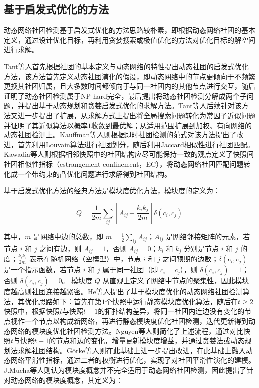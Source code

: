 \subsection{基于启发式优化的方法}
动态网络社团检测基于启发式优化的方法思路较朴素，即根据动态网络社团的基本定义，通过设计优化目标，再利用贪婪搜索或极值优化的方法对优化目标的解空间进行求解。

Tant等人\cite{tantipathananandh2007framework}首先根据社团的基本定义与动态网络的特性提出动态社团的启发式优化方法，该方法首先定义动态社团演化的假设，即动态网络中的节点更倾向于不频繁更换其社团归属，且大多数时间都倾向于与同一社团内的其他节点进行交互，随后证明了动态社团检测属于NP-hard完全，最后提出将动态社团检测分解成两个子问题，并提出基于动态规划和贪婪启发式优化的求解方法。Tant等人后续针对该方法又进一步提出了扩展，从求解方式上提出将全局搜索问题转化为常因子近似问题并证明了其近似算法以概率$1$收敛到最优解\cite{tantipathananandh2009constant}；从适用范围扩展到加权、有向网络的动态社团检测上\cite{tantipathananandh2011finding}。Kauffman等人\cite{kauffman2014dyconet}则根据即时社团检测的范式对该方法提出了改进，首先利用Louvain算法进行社团划分，随后利用Jaccard相似性进行社团匹配。Kawadia等人\cite{kawadia2012sequential}则根据相邻快照中的社团结构应尽可能保持一致的观点定义了快照间社团相似性指标（estrangement confinement，EC），将动态网络社团匹配问题转化成一个带约束的凸优化问题进行求解得到社团结构。

基于启发式优化方法的经典方法是模块度优化方法，模块度\cite{newman2004finding}的定义为：


\begin{equation}
	Q = \frac{1}{2m} \sum_{ij} \left[ A_{ij} - \frac{k_i k_j}{2m} \right] \delta(c_i, c_j)
\end{equation}

其中，\( m \) 是网络中边的总数，即 \( m = \frac{1}{2} \sum_{ij} A_{ij} \)；\( A_{ij} \) 是网络邻接矩阵的元素，若节点 \( i \) 和 \( j \) 之间有边，则 \( A_{ij} = 1 \)，否则 \( A_{ij} = 0 \)；\( k_i \) 和 \( k_j \) 分别是节点 \( i \) 和 \( j \) 的度；\( \frac{k_i k_j}{2m} \) 表示在随机网络（空模型）中，节点 \( i \) 和 \( j \) 之间预期的边数；\( \delta(c_i, c_j) \) 是一个指示函数，若节点 \( i \) 和 \( j \) 属于同一社团（即 \( c_i = c_j \)），则 \( \delta(c_i, c_j) = 1 \)；否则 \( \delta(c_i, c_j) = 0 \)。
模块度 \( Q \) 从直观上定义了网络中节点的聚集性，因此模块度越高则社团连接越紧密。He等人\cite{he2015fast}提出了基于模块度优化的动态网络社团检测算法，其优化思路如下：首先在第\(1\)个快照中运行静态模块度优化算法，随后在$t \ge 2$快照中，根据快照$t$与快照$t-1$的拓扑结构差异，将同一社团内连边没有变化的节点视作一个节点以构成新网络，再进行静态模块度优化社团检测，迭代更新得到动态网络的模块度优化社团检测方法。Nguyen等人\cite{nguyen2011adaptive}则简化了上述流程，通过对比快照$t$与快照$t-1$的节点和边的变化，增量更新模块度增益，并通过贪婪法或动态规划法求解社团结构。G{\"o}rke等人\cite{gorke2013dynamic}则在此基础上进一步提出改进，在此基础上融入动态网络平滑性指标，通过二者的权衡进行优化，实现了对社团平滑性演化的建模。J.Mucha等人\cite{mucha2010community}则认为模块度概念并不完全适用于动态网络社团检测，因此提出了针对动态网络的模块度概念，其定义为：

